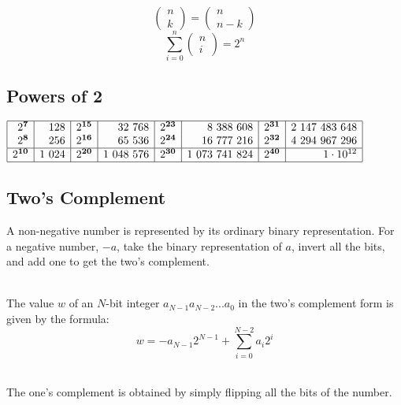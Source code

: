 \documentclass[a4paper, 12pt]{article}
\begin{document}
$$\left(\begin{array}{c}n\\ k\end{array}\right) = \left(\begin{array}{c}n\\ n-k\end{array}\right)$$
$$\sum_{i=0}^{n}\left(\begin{array}{c}n\\ i\end{array}\right) = 2^n$$

  \subsection{Powers of 2}

\begin{center}
\begin{math}
  \begin{array}{|r|r|r|r|r|r|r|r|}
    \hline
    2^\textbf{7} & 128 & 2^{\textbf{15}} & 32\ 768 & 2^{\textbf{23}} & 8\ 388\ 608 & 2^{\textbf{31}} & 2\ 147\ 483\ 648 \\
    2^\textbf{8} & 256 & 2^{\textbf{16}} & 65\ 536 & 2^{\textbf{24}} & 16\ 777\ 216 & 2^{\textbf{32}} & 4\ 294\ 967\ 296 \\
    \hline
    2^{\textbf{10}} & 1\ 024 & 2^{\textbf{20}} & 1\ 048\ 576 & 2^{\textbf{30}} & 1\ 073\ 741\ 824 & 2^{\textbf{40}} & 1\cdot 10^{12} \\
    \hline
  \end{array}
\end{math}
\end{center}

  \subsection{Two's Complement}

A non-negative number is represented by its ordinary binary representation. For a negative number, $-a$, take the binary representation of $a$, invert all the bits, and add one to get the two's complement.

~\\
The value $w$ of an $N$-bit integer $a_{N-1}a_{N-2}...a_0$ in the two's complement form is given by the formula:
$$w = -a_{N-1}2^{N-1} + \sum_{i=0}^{N-2}a_i2^i$$

~\\
The one's complement is obtained by simply flipping all the bits of the number.
\end{document}
